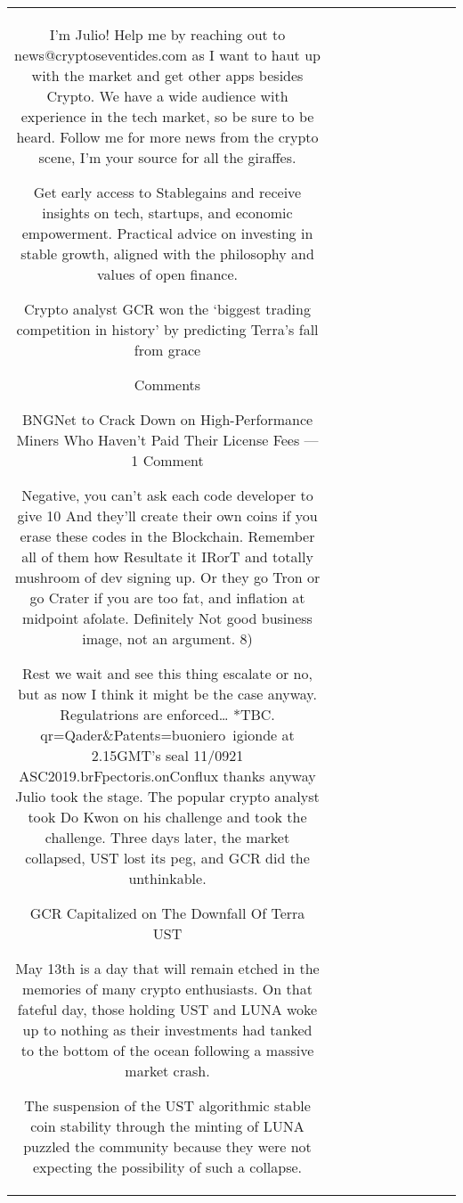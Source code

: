\begin{table}[h!]
\begin{tabular}{|c|c|c|c|c|c|c|c|c|c|}
I'm Julio! Help me by reaching out to news@cryptoseventides.com as I want to haut up with the market and get other apps besides Crypto. We have a wide audience with experience in the tech market, so be sure to be heard. Follow me for more news from the crypto scene, I'm your source for all the giraffes.

Get early access to Stablegains and receive insights on tech, startups, and economic empowerment. Practical advice on investing in stable growth, aligned with the philosophy and values of open finance.

Crypto analyst GCR won the ‘biggest trading competition in history’ by predicting Terra’s fall from grace

Comments

BNGNet to Crack Down on High-Performance Miners Who Haven’t Paid Their License Fees — 1 Comment

Negative, you can’t ask each code developer to give 10%
And they’ll create their own coins if you erase these codes in the Blockchain. Remember all of them how Resultate it IRorT and totally mushroom of dev signing up. Or they go Tron or go Crater if you are too fat, and inflation at midpoint afolate. Definitely Not good business image, not an argument. 8)

Rest we wait and see this thing escalate or no, but as now I think it might be the case anyway. Regulatrions are enforced… *TBC. qr=Qader\&Patents=buoniero~igionde at 2.15GMT’s seal 11/0921 ASC2019.brFpectoris.onConflux thanks anyway Julio took the stage. The popular crypto analyst took Do Kwon on his challenge and took the challenge. Three days later, the market collapsed, UST lost its peg, and GCR did the unthinkable.

GCR Capitalized on The Downfall Of Terra UST

May 13th is a day that will remain etched in the memories of many crypto enthusiasts. On that fateful day, those holding UST and LUNA woke up to nothing as their investments had tanked to the bottom of the ocean following a massive market crash.

The suspension of the UST algorithmic stable coin stability through the minting of LUNA puzzled the community because they were not expecting the possibility of such a collapse.


\end{tabular}
\end{table}
